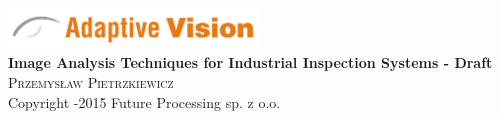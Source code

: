 \newcommand{\coverPage}[3]
{
	\begin{titlingpage}
	\begin{center}


	\includegraphics[width=0.50\textwidth]{./logo}\\[5cm]    





	{ \huge \bfseries #2}\\[0.4cm]

	\textsc{\Large #1}\\[0.5cm]
	\null
	\vfill
	{\small #3}
	\end{center}
	\end{titlingpage}



	\thispagestyle{empty}	
	\newpage
}


\coverPage
{Przemys\l aw Pietrzkiewicz}
{Image Analysis Techniques for Industrial Inspection Systems - Draft}
{Copyright \textcopyright 2012-2015 Future Processing sp. z o.o.}
